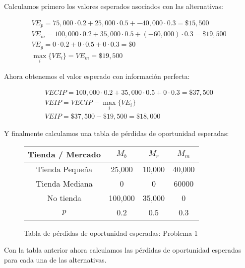 \documentclass{article}
\begin{document}
            Calculamos primero los valores esperados asociados con las alternativas:

            \begin{gather*}
                VE_p = 75,000 \cdot 0.2 + 25,000 \cdot 0.5 + -40,000 \cdot 0.3 = \$ 15,500 \\
                VE_m = 100,000 \cdot 0.2 + 35,000 \cdot 0.5 + (-60,000) \cdot 0.3 = \$ 19,500 \\
                VE_g = 0 \cdot 0.2 + 0 \cdot 0.5 + 0 \cdot 0.3 = \$ 0 \\
                \max_i \{VE_i\} = VE_m = \$ 19,500
            \end{gather*}

            Ahora obtenemos el valor esperado con información perfecta:

            \begin{gather*}
                VECIP = 100,000 \cdot 0.2 + 35,000 \cdot 0.5 + 0 \cdot 0.3 = \$ 37,500 \\
                VEIP = VECIP - \max_i \{VE_i\} \\
                VEIP = \$ 37,500 - \$ 19,500 = \$ 18,000
            \end{gather*}

            Y finalmente calculamos una tabla de pérdidas de oportunidad esperadas:

            \begin{figure}[htbp!]
                \centering
                \begin{tabular}{ |cccc| }
                    \hline
                    Tienda / Mercado & $M_b$ & $M_r$ & $M_m$ \\
                    \hline
                    Tienda Pequeña & 25,000 & 10,000 & 40,000 \\
                    \hline
                    Tienda Mediana & 0 & 0 & 60000 \\
                    \hline
                    No tienda & 100,000 & 35,000 & 0 \\
                    \hline
                    $p$ & 0.2 & 0.5 & 0.3 \\
                    \hline
                \end{tabular}
                \caption{Tabla de pérdidas de oportunidad esperadas: Problema 1}
                \label{tabla:poe1}
            \end{figure}

            Con la tabla anterior ahora calculamos las pérdidas de oportunidad esperadas para cada una de las alternativas.
\end{document}

